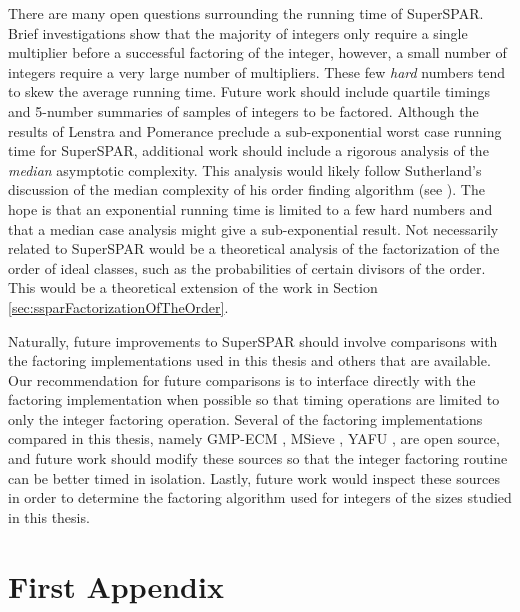 \documentclass{ucalgthes1}
\theoremstyle{definition}
\begin{document}
There are many open questions surrounding the running time of SuperSPAR.  Brief investigations show that the majority of integers only require a single multiplier before a successful factoring of the integer, however, a small number of integers require a very large number of multipliers.  These few \emph{hard} numbers tend to skew the average running time.  Future work should include quartile timings and 5-number summaries of samples of integers to be factored.  Although the results of Lenstra and Pomerance \cite[\S 11]{Lenstra1992} preclude a sub-exponential worst case running time for SuperSPAR, additional work should include a rigorous analysis of the \emph{median} asymptotic complexity.  This analysis would likely follow Sutherland's discussion of the median complexity of his order finding algorithm (see \cite[\S 5.4]{Sutherland2007}).  The hope is that an exponential running time is limited to a few hard numbers and that a median case analysis might give a sub-exponential result.  Not necessarily related to SuperSPAR would be a theoretical analysis of the factorization of the order of ideal classes, such as the probabilities of certain divisors of the order.  This would be a theoretical extension of the work in Section \ref{sec:ssparFactorizationOfTheOrder}.

Naturally, future improvements to SuperSPAR should involve comparisons with the factoring implementations used in this thesis and others that are available.  Our recommendation for future comparisons is to interface directly with the factoring implementation when possible so that timing operations are limited to only the integer factoring operation.  Several of the factoring implementations compared in this thesis, namely GMP-ECM \cite{Ecm}, MSieve \cite{Msieve}, YAFU \cite{Yafu}, are open source, and future work should modify these sources so that the integer factoring routine can be better timed in isolation.  Lastly, future work would inspect these sources in order to determine the factoring algorithm used for integers of the sizes studied in this thesis.


\appendix
\chapter{First Appendix}
\end{document}
